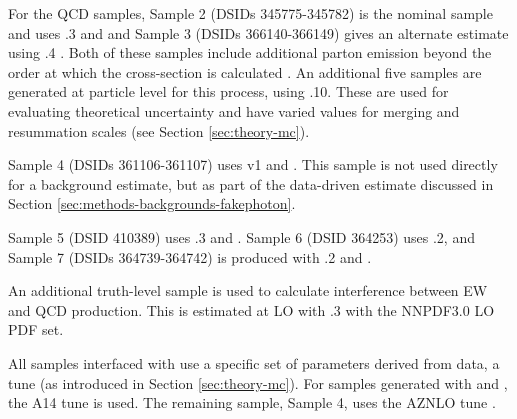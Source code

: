 For the \ac{QCD} \Zy samples, Sample 2 (\acp{DSID} 345775-345782) is the nominal
sample and uses .3 and  and Sample 3
(\acp{DSID} 366140-366149) gives an alternate estimate using .4
\cite{sherpa2dot2}. Both of these samples include additional parton emission
beyond the order at which the cross-section is calculated \cite{VBSZy-CONF}. An
additional five samples are generated at particle level for this process, using
.10. These are used for evaluating theoretical uncertainty and have
varied values for merging and resummation scales (see Section
\ref{sec:theory-mc}).

Sample 4 (\acp{DSID} 361106-361107) uses \powhegbox v1
\cite{Nason2004,powheg,powhegbox} and  \cite{pythia8dot1}.
This sample is not used directly for a background estimate, but as part of the
data-driven estimate discussed in Section
\ref{sec:methods-backgrounds-fakephoton}.

Sample 5 (\ac{DSID} 410389) uses .3 and .
Sample 6 (\ac{DSID} 364253) uses .2, and Sample 7 (\acp{DSID}
364739-364742) is produced with .2 and .

An additional truth-level sample is used to calculate interference between
\ac{EW} and \ac{QCD} \Zyjj production. This is estimated at \ac{LO} with
.3 with the NNPDF3.0 \ac{LO} \ac{PDF} set.

All samples interfaced with \pythia use a specific set of parameters derived
from data, a tune (as introduced in Section \ref{sec:theory-mc}). For samples
generated with \madgraph and \pythia, the A14 tune \cite{A14tune} is used. The
remaining \pythia sample, Sample 4, uses
the AZNLO tune \cite{AZNLOtune}.

%

